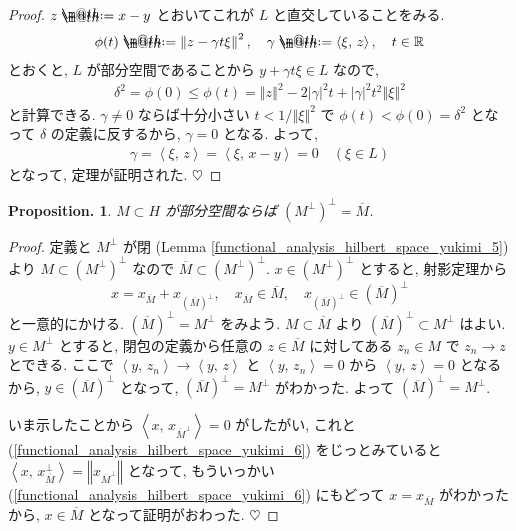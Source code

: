 \documentclass[openany, a4paper, oneside]{book}
\makeatletter
\newcommand*{\defeq}{\mathrel{\rlap{%
\raisebox{0.3ex}{$\m@th\cdot$}}%
\raisebox{-0.3ex}{$\m@th\cdot$}}%
=}
\theoremstyle{break}
\newtheorem{prop}[thm]{Proposition.}
\theoremstyle{breakdefn}
\newcommand{\abs}[1]{\left|#1\right|}
\newcommand{\norm}[1]{\left\Vert#1\right\Vert}
\newcommand{\rbk}[1]{\left (#1\right)}
\newcommand{\bkt}[2]{\left\langle#1,\,#2\right\rangle}
\makeatother
\begin{document}
\begin{proof}
$z \defeq x - y$ とおいてこれが $L$ と直交していることをみる.
\begin{align}
 \phi(t)
 \defeq
 \norm{z - \gamma t \xi}^2, \quad
 \gamma \defeq \bkt{\xi}{z}, \quad
 t\in \mathbb{R}
\end{align}
とおくと, $L$ が部分空間であることから $y + \gamma t\xi \in L$ なので,
\begin{align}
 \delta^2
 =
 \phi (0)
 \leq
 \phi (t)
 =
 \norm{z}^2 - 2 \abs{\gamma}^2 t + \abs{\gamma}^2 t^2 \norm{\xi}^2
\end{align}
と計算できる.
$\gamma \neq 0$ ならば十分小さい $t < 1 / \norm{\xi}^2$ で
$\phi (t) < \phi (0) = \delta^2$ となって $\delta$ の定義に反するから, $\gamma = 0$ となる.
よって,
\begin{align}
 \gamma
 =
 \bkt{\xi}{z}
 =
 \bkt{\xi}{x - y}
 =
 0 \quad \rbk{\xi \in L}
\end{align}
となって, 定理が証明された.
$\heartsuit$
\end{proof}
\begin{prop}
 $M \subset H$ が部分空間ならば $(M^{\perp})^{\perp} = \overline{M}$.
\end{prop}
\begin{proof}
定義と $M^{\perp}$ が閉 (Lemma \ref{functional_analysis_hilbert_space_yukimi_5}) より
$M \subset (M^\perp)^\perp$ なので $\overline{M} \subset (M^\perp)^\perp$.
$x \in (M^\perp)^\perp$ とすると, 射影定理から
\begin{equation}
 x
 =
 x_{\overline{M}} + x_{(\overline{M})^\perp}, \quad
 x_{\overline{M}}\in \overline{M}, \quad
 x_{(\overline{M})^\perp} \in (\overline{M})^\perp \label{functional_analysis_hilbert_space_yukimi_6}
\end{equation}
と一意的にかける.
$(\overline{M})^\perp = M^\perp$ をみよう.
$M \subset \overline{M}$ より $(\overline{M})^\perp \subset M^\perp$ はよい.
$y \in M^\perp$ とすると, 閉包の定義から任意の $z \in \overline{M}$ に対してある
$z_{n} \in M$ で $z_{n} \to z$ とできる.
ここで $\bkt{y}{z_n} \to \bkt{y}{z}$ と $\bkt{y}{z_n} = 0$ から $\bkt{y}{z} = 0$ となるから,
$y \in (\overline{M})^\perp$ となって, $(\overline{M})^\perp = M^\perp$ がわかった.
よって $(\overline{M})^\perp = M^\perp$.

いま示したことから $\bkt{x}{x_{\overline{M}^{\perp}}} = 0$ がしたがい, これと (\ref{functional_analysis_hilbert_space_yukimi_6})
をじっとみていると $\bkt{x}{x_{\overline{M}}^{\perp}} = \norm{x_{\overline{M}^{\perp}}}$ となって,
もういっかい (\ref{functional_analysis_hilbert_space_yukimi_6}) にもどって
$x = x_{\overline{M}}$ がわかったから, $x \in \overline{M}$ となって証明がおわった.
$\heartsuit$
\end{proof}
\end{document}
